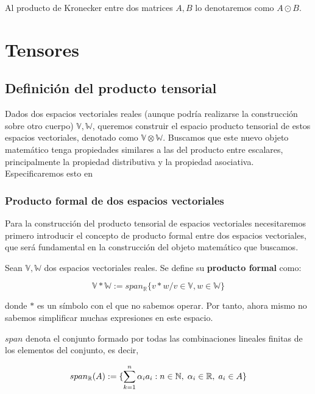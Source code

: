 Al producto de Kronecker entre dos matrices $A, B$ lo denotaremos como $A \odot B$.

\section{Tensores}

\subsection{Definición del producto tensorial} \label{sec:deftensor}

Dados dos espacios vectoriales reales (aunque podría realizarse la construcción sobre otro cuerpo) $\mathbb{V}, \mathbb{W}$, queremos construir el espacio producto tensorial de estos espacios vectoriales, denotado como $\mathbb{V} \otimes \mathbb{W}$. Buscamos que este nuevo objeto matemático tenga propiedades similares a las del producto entre escalares, principalmente la propiedad distributiva y la propiedad asociativa. Especificaremos esto en 

\subsubsection{Producto formal de dos espacios vectoriales}

Para la construcción del producto tensorial de espacios vectoriales necesitaremos primero introducir el concepto de producto formal entre dos espacios vectoriales, que será fundamental en la construcción del objeto matemático que buscamos.

\begin{definicion}
    Sean $\mathbb{V}, \mathbb{W}$ dos espacios vectoriales reales. Se define su \textbf{producto formal} como:

    \begin{equation}
        \mathbb{V} \ast \mathbb{W} := span_{\mathbb{R}} \{v \ast w / v \in \mathbb{V}, w \in \mathbb{W} \}
    \end{equation}

    donde $*$ es un símbolo con el que no sabemos operar. Por tanto, ahora mismo no sabemos simplificar muchas expresiones en este espacio.

\end{definicion}

\begin{observacion}

    $span$ denota el conjunto formado por todas las combinaciones lineales finitas de los elementos del conjunto, es decir,

    \begin{equation}
        span_{\mathbb{R}}(A) := \{ \sum_{k = 1}^n \alpha_i a_i : n \in \mathbb{N}, \; \alpha_i \in \mathbb{R}, \; a_i \in A \}
    \end{equation}


\end{observacion}

